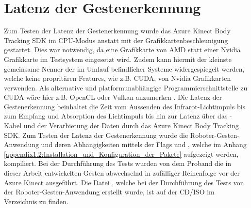 












\section{Latenz der Gestenerkennung}
Zum Testen der Latenz der Gestenerkennung wurde das Azure Kinect Body Tracking SDK im CPU-Modus anstatt mit der Grafikkartenbeschleunigung gestartet. Dies war notwendig, da eine Grafikkarte von AMD statt einer Nvidia Grafikkarte im Testsystem eingesetzt wird. Zudem kann hiermit der kleinste gemeinsame Nenner der im Umlauf befindlicher Systeme widergespiegelt werden, welche keine propritären Features, wie z.B. CUDA, von Nvidia Grafikkarten verwenden. Als alternative und platformunabhängige Programmierschnittstelle zu CUDA wäre hier z.B. OpenCL oder Vulkan anzumerken \cite{vulkan_api_2020}. Die Latenz der Gestenerkennung beinhaltet die Zeit vom Aussenden des Infrarot-Lichtimpuls bis zum Empfang und Absorption des Lichtimpuls bis hin zur Latenz über das -Kabel und der Verarbietung der Daten durch das Azure Kinect Body Tracking SDK. Zum Testen der Latenz der Gestenerkennung wurde die Roboter-Gesten-Anwendung und deren Abhängigkeiten mittels der Flags  und , welche im Anhang \ref{appendix1.2:Installation_und_Konfiguration_der_Pakete} aufgezeigt werden, kompiliert. Bei der Durchführung des Tests wurden von dem Proband die in dieser Arbeit entwickelten Gesten abwechselnd in zufälliger Reihenfolge vor der Azure Kinect ausgeführt. Die Datei , welche bei der Durchführung des Tests von der Roboter-Gesten-Anwendung erstellt wurde, ist auf der CD/ISO im Verzeichnis  zu finden.

